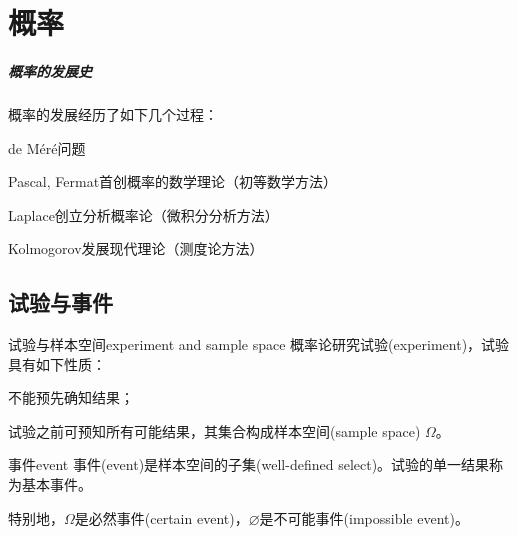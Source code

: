 	
\chapter{概率}

\paragraph{概率的发展史}

概率的发展经历了如下几个过程：

\begin{compactitem}
	\item de M\'er\'e问题
	\item Pascal, Fermat首创概率的数学理论（初等数学方法）
	\item Laplace创立分析概率论（微积分分析方法）
	\item Kolmogorov发展现代理论（测度论方法）
\end{compactitem}

\section{试验与事件}
\label{sec:experiment and event}

\begin{definition}{试验与样本空间}{experiment and sample space}
    概率论研究试验(experiment)，试验具有如下性质：
    \begin{compactenum}
    	\item 不能预先确知结果；
    	\item 试验之前可预知所有可能结果，其集合构成样本空间(sample space) $\Omega$。
    \end{compactenum}
\end{definition}

\begin{definition}{事件}{event}
    事件(event)是样本空间的子集(well-defined select)。试验的单一结果称为基本事件。

    特别地，$\Omega$是必然事件(certain event)，$\varnothing$是不可能事件(impossible event)。
\end{definition}

